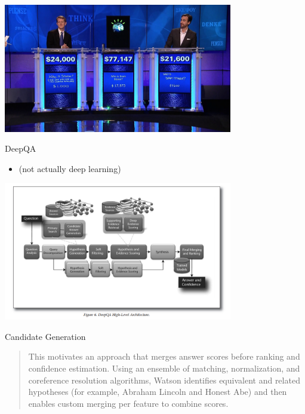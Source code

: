 \documentclass{beamer}
\begin{document}
\begin{frame}
  \begin{center}
    \includegraphics[width=10cm]{IBMwatson}
  \end{center}
\end{frame}

\begin{frame}{DeepQA}
  \begin{itemize}
  \item (not actually deep learning)
  \end{itemize}
\end{frame}

\begin{frame}
  \begin{center}
    \includegraphics[width=10cm]{deepqa}
  \end{center}
\end{frame}

\begin{frame}{Candidate Generation}
  
\end{frame}

\begin{frame}
  \begin{quote}
    This motivates an approach that merges answer scores before
    ranking and confidence estimation.  Using an ensemble of matching,
    normalization, and coreference resolution algorithms, Watson
    identifies equivalent and related hypotheses (for example, Abraham
    Lincoln and Honest Abe) and then enables custom merging per
    feature to combine scores.
  \end{quote}
\end{frame}
\end{document}
